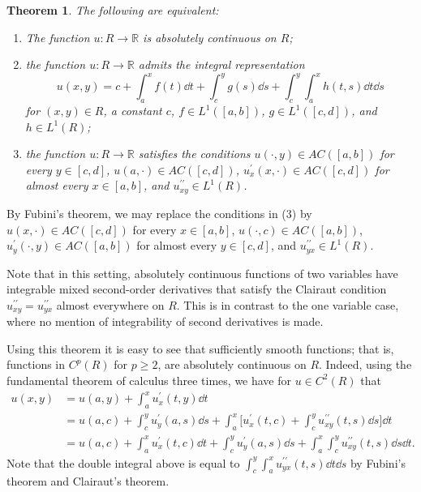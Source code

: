 \documentclass[11pt,leqno]{article}
\theoremstyle{plain}
\newtheorem{theorem}[lem]{Theorem}
\theoremstyle{definition}
\numberwithin{equation}{section}
\numberwithin{lem}{section}
\begin{document}
\begin{theorem}\label{thm2}
    The following are equivalent:\begin{enumerate}[label=\textup{(\arabic*)}]
        \item The function $u\colon R\to\mathbb R$ is absolutely continuous on $R$;
        \item the function $u\colon R\to\mathbb R$ admits the integral representation 
        \begin{equation}
            u(x,y) = c + \int_a^x f(t)\dd t + \int_c^y g(s)\dd s + \int_c^y\int_a^x h(t,s)\dd t \dd s
        \end{equation}
        for $(x,y)\in R$, a constant $c$, $f\in L^1([a,b])$, $g\in L^1([c,d])$, and $h\in L^1(R)$;
        \item the function $u\colon R\to\mathbb R$ satisfies the conditions $u(\cdot,y)\in AC([a,b])$ for every $y\in [c,d]$, $u(a,\cdot)\in AC([c,d])$, $u^\prime_x(x,\cdot)\in AC([c,d])$ for almost every $x\in [a,b]$, and $u^{\prime\prime}_{xy}\in L^1(R)$.
    \end{enumerate}
\end{theorem}
By Fubini's theorem, we may replace the conditions in (3) by $u(x,\cdot)\in AC([c,d])$ for every $x\in [a,b]$, $u(\cdot,c)\in AC([a,b])$, $u^\prime_y(\cdot,y)\in AC([a,b])$ for almost every $y\in [c,d]$, and $u^{\prime\prime}_{yx}\in L^1(R)$.

Note that in this setting, absolutely continuous functions of two variables have integrable mixed second-order derivatives that satisfy the Clairaut condition $u^{\prime\prime}_{xy} = u^{\prime\prime}_{yx}$ almost everywhere on $R$. This is in contrast to the one variable case, where no mention of integrability of second derivatives is made.

Using this theorem it is easy to see that sufficiently smooth functions; that is, functions in $C^p(R)$ for $p\geq 2$, are absolutely continuous on $R$. Indeed, using the fundamental theorem of calculus three times, we have for $u\in C^2(R)$ that
\begin{align}
    u(x,y) &= u(a,y) + \int_a^x u^\prime_x(t,y)\dd t \\
    &= u(a,c) + \int_c^y u^\prime_y(a,s)\dd s + \int_a^x \bigg[u^\prime_x(t,c) + \int_c^y u^{\prime\prime}_{xy}(t,s)\dd s\bigg] \dd t\nonumber\\
    &= u(a,c) + \int_a^x u^\prime_x(t,c) \dd t + \int_c^y u^\prime_y(a,s)\dd s  + \int_a^x \int_c^y u^{\prime\prime}_{xy}(t,s)\dd s \dd t.\nonumber
\end{align} Note that the double integral above is equal to $ \int_c^y \int_a^x u^{\prime\prime}_{yx}(t,s)\dd t \dd s$ by Fubini's theorem and Clairaut's theorem.
\end{document}
